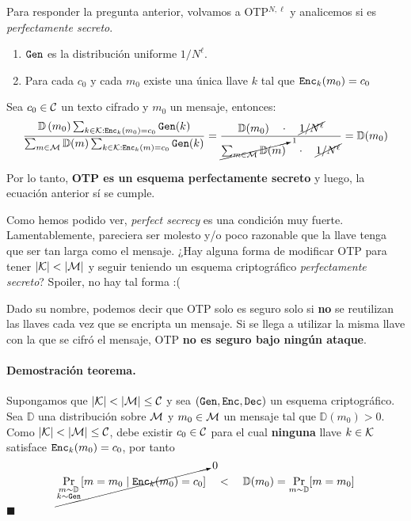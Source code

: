 Para responder la pregunta anterior, volvamos a OTP$^{N,\ell}$ y analicemos si es \textit{perfectamente secreto}.
\begin{enumerate}
    \item $\texttt{Gen}$ es la distribución uniforme $1/N^\ell$.
    \item Para cada $c_0$ y cada $m_0$ existe una única llave $k$ tal que $\texttt{Enc}_k(m_0) = c_0$
\end{enumerate}

Sea $c_0 \in \mathcal{C}$ un texto cifrado y $m_0$ un mensaje, entonces:
$$
    \frac{\mathbb{D}\left(m_0\right) \sum_{k \in \mathcal{K}: \texttt{Enc}_k\left(m_0\right)=c_0} \texttt{Gen}(k)}{\sum_{m \in \mathcal{M}} \mathbb{D}(m) \sum_{k \in \mathcal{K}: \texttt{Enc}_k(m)=c_0} \texttt{Gen}(k)} = \frac{\mathbb{D}(m_0) \quad \cdot \quad \cancel{1/N^\ell}}{\cancelto{1}{\sum_{m \in \mathcal{M}}\mathbb{D}(m)} \quad \cdot \quad \cancel{1/N^\ell}} = \mathbb{D}(m_0)
$$

Por lo tanto, \textbf{OTP es un esquema perfectamente secreto} y luego, la ecuación anterior sí se cumple. \medbreak

Como hemos podido ver, \textit{perfect secrecy} es una condición muy fuerte. Lamentablemente, pareciera ser molesto y/o poco razonable que la llave tenga que ser tan larga como el mensaje. ¿Hay alguna forma de modificar OTP para tener $|\mathcal{K}| < |\mathcal{M}|$ y seguir teniendo un esquema criptográfico \textit{perfectamente secreto}? Spoiler, no hay tal forma :(


Dado su nombre, podemos decir que OTP solo es seguro solo si \textbf{no} se reutilizan las llaves cada vez que se encripta un mensaje. Si se llega a utilizar la misma llave con la que se cifró el mensaje, OTP \textbf{no es seguro bajo ningún ataque}.

\paragraph*{Demostración teorema.} Supongamos que $|\mathcal{K}| < |\mathcal{M}| \leq \mathcal{C}$ y sea $(\texttt{Gen}, \texttt{Enc}, \texttt{Dec})$ un esquema criptográfico. Sea $\mathbb{D}$ una distribución sobre $\mathcal{M}$ y $m_0 \in \mathcal{M}$ un mensaje tal que $\mathbb{D}(m_0) > 0$. Como $|\mathcal{K}| < |\mathcal{M}| \leq \mathcal{C}$, debe existir $c_0 \in \mathcal{C}$ para el cual \textbf{ninguna} llave $k \in \mathcal{K}$ satisface $\texttt{Enc}_k(m_0) = c_0$, por tanto
$$
    \cancelto{0}{\Pr_{\substack{m \sim \mathbb{D} \\ k \sim \texttt{Gen}}} [m = m_0 \mid \texttt{Enc}_k(m_0) = c_0]} \quad < \quad \mathbb{D}(m_0) = \Pr_{m \sim \mathbb{D}} [m = m_0]
$$
\hfill $\blacksquare$

